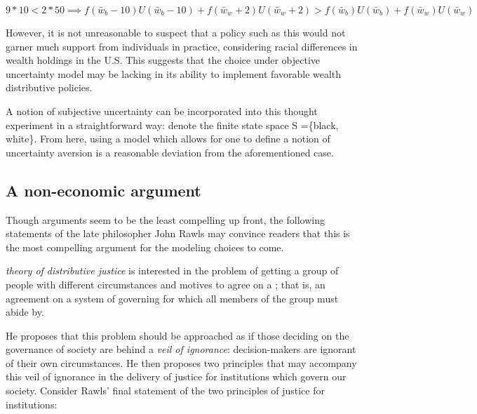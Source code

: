 \documentclass[\econtexRoot/IneqMeas]{subfiles}
\begin{document}
$$ 9 * 10 < 2 * 50 \implies f(\bar{w}_b - 10)U(\bar{w}_b -10) + f(\bar{w}_w +2)U(\bar{w}_w + 2) > f(\bar{w}_b )U(\bar{w}_b) + f(\bar{w}_w)U(\bar{w}_w)   $$

\par However, it is not unreasonable to suspect that a policy such as this would not garner much support from individuals in practice, considering racial differences in wealth holdings in the U.S. This suggests that the choice under objective uncertainty model may be lacking in its ability to implement favorable wealth distributive policies.

\par A notion of subjective uncertainty can be incorporated into this thought experiment in a straightforward way: denote the finite state space S =\{black, white\}. From here, using a model which allows for one to define a notion of uncertainty aversion is a reasonable deviation from the aforementioned case.

\subsection{A non-economic argument}

\par Though  arguments seem to be the least compelling up front, the following statements of the late philosopher John Rawls may convince readers that this is the most compelling argument for the modeling choices to come.

\par \cite{jr71} \textit{theory of distributive justice} is interested in the problem of getting a group of people with different circumstances and motives to agree on a ; that is, an agreement on a system of governing for which all members of the group must abide by.

\par He proposes that this problem should be approached as if those deciding on the governance of society are behind a \textit{veil of ignorance}: decision-makers are ignorant of their own circumstances. He then proposes two principles that may accompany this veil of ignorance in the delivery of justice for institutions which govern our society. Consider Rawls' final statement of the two principles of justice for institutions:
\end{document}
